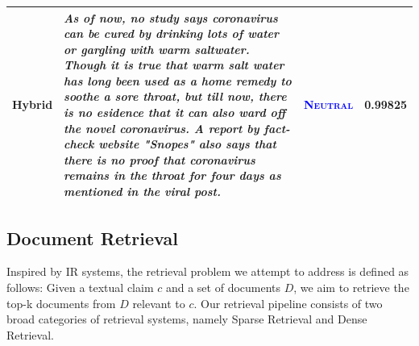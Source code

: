 \documentclass[11pt]{article}
\begin{document}
\begin{table}[!t]
{\begin{tabular}{c|p{25em}|c|c}
    Hybrid & \textit{As of now, no study says coronavirus can be cured by drinking lots of water or gargling with warm saltwater. Though it is true that warm salt water has long been used as a home remedy to soothe a sore throat, but till now, there is no esidence that it can also ward off the novel coronavirus. A report by fact-check website "Snopes" also says that there is no proof that coronavirus remains in the throat for four days as mentioned in the viral post.} & \textcolor{blue}{\textsc{Neutral}} & 0.99825%
    \\
    \hline
\end{tabular}}
\label{tab:response}
\end{table}

\subsection{Document Retrieval}
Inspired by IR systems, the retrieval problem we attempt to address is defined as follows: Given a textual claim $c$ and a set of documents $D$, we aim to retrieve the top-k documents from $D$ relevant to $c$. Our retrieval pipeline consists of two broad categories of retrieval systems, namely Sparse Retrieval and Dense Retrieval.
\end{document}
